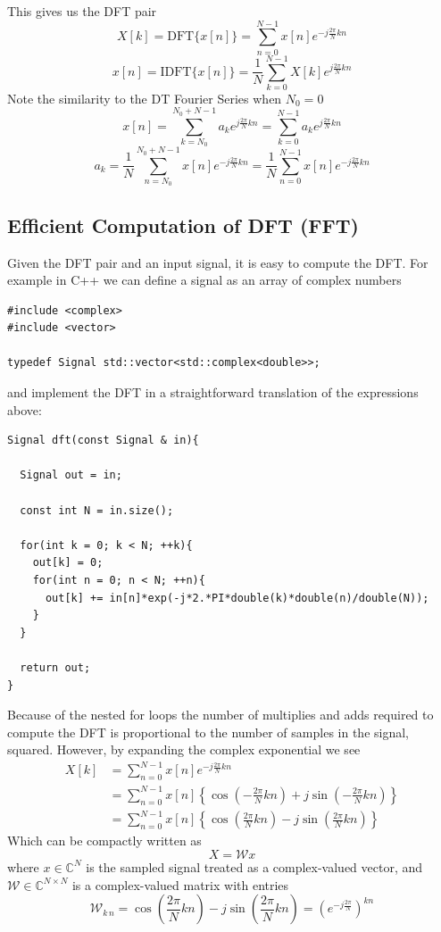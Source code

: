 This gives us the DFT pair
\[
X[k] = \text{DFT} \{ x[n] \} = \sum_{n = 0}^{N-1}  x[n] e^{-j \frac{2\pi}{N}k n}
\]
\[
x[n] = \text{IDFT} \{ x[n] \} = \frac{1}{N} \sum_{k = 0}^{N-1}  X[k] e^{j \frac{2\pi}{N}k n}
\]
Note the similarity to the DT Fourier Series when $N_0 = 0$
\[
x[n] = \sum\limits_{k = N_0}^{N_0 + N - 1} a_k e^{j\frac{2\pi}{N}kn} =  \sum\limits_{k = 0}^{N - 1} a_k e^{j\frac{2\pi}{N}kn}
\]
\[
a_k = \frac{1}{N}\sum\limits_{n = N_0}^{N_0 + N - 1} x[n] e^{-j\frac{2\pi}{N}kn} =  \frac{1}{N}\sum\limits_{n = 0}^{N - 1} x[n] e^{-j\frac{2\pi}{N}kn}
\]

\subsection{Efficient Computation of DFT (FFT)}

Given the DFT pair and an input signal, it is easy to compute the DFT. For example in C++ we can define a signal as an array of complex numbers

\begin{verbatim}
#include <complex>
#include <vector>

typedef Signal std::vector<std::complex<double>>;
\end{verbatim}

and implement the DFT in a straightforward translation of the expressions above:

\begin{verbatim}
Signal dft(const Signal & in){

  Signal out = in;
  
  const int N = in.size();

  for(int k = 0; k < N; ++k){
    out[k] = 0;
    for(int n = 0; n < N; ++n){
      out[k] += in[n]*exp(-j*2.*PI*double(k)*double(n)/double(N));
    }
  }

  return out;
}
\end{verbatim}

Because of the nested for loops the number of multiplies and adds required to compute the DFT is proportional to the number of samples in the signal, squared. However, by expanding the complex exponential we see
\begin{align*}
  X[k] &= \sum_{n = 0}^{N-1}  x[n] e^{-j \frac{2\pi}{N}k n}\\
  &= \sum_{n = 0}^{N-1}  x[n] \left\{ \cos\left( -\frac{2\pi}{N}k n\right) + j \sin\left(-\frac{2\pi}{N}k n \right)\right\}\\
  &= \sum_{n = 0}^{N-1}  x[n] \left\{ \cos\left( \frac{2\pi}{N}k n\right) - j \sin\left(\frac{2\pi}{N}k n \right)\right\}
\end{align*}
Which can be compactly written as
\[
X = \mathcal{W} x
\]
where $x \in \mathbb{C}^N$ is the sampled signal treated as a complex-valued vector, and $\mathcal{W} \in \mathbb{C}^{N\times N}$ is a complex-valued matrix with entries
\[
\mathcal{W}_{k\,n} = \cos\left( \frac{2\pi}{N}k n\right) - j \sin\left(\frac{2\pi}{N}k n \right) = \left( e^{-j\frac{2\pi}{N}}\right)^{kn}
\]  

